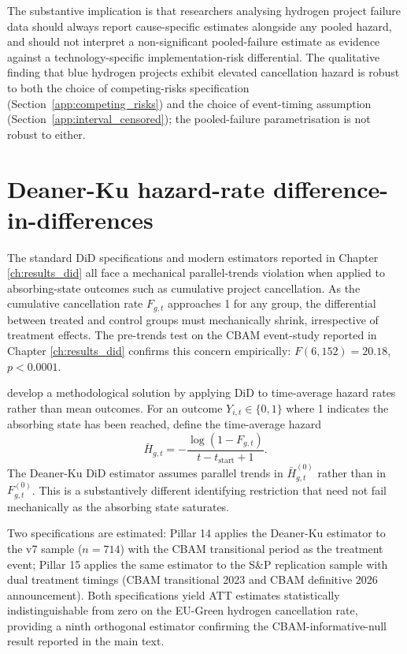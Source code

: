 The substantive implication is that researchers analysing hydrogen project failure data should always report cause-specific estimates alongside any pooled hazard, and should not interpret a non-significant pooled-failure estimate as evidence against a technology-specific implementation-risk differential. The qualitative finding that blue hydrogen projects exhibit elevated cancellation hazard is robust to both the choice of competing-risks specification (Section~\ref{app:competing_risks}) and the choice of event-timing assumption (Section~\ref{app:interval_censored}); the pooled-failure parametrisation is not robust to either.

\section{Deaner-Ku hazard-rate difference-in-differences}
\label{app:deaner_ku}

The standard DiD specifications and modern estimators reported in Chapter \ref{ch:results_did} all face a mechanical parallel-trends violation when applied to absorbing-state outcomes such as cumulative project cancellation. As the cumulative cancellation rate $F_{g,t}$ approaches 1 for any group, the differential between treated and control groups must mechanically shrink, irrespective of treatment effects. The pre-trends test on the CBAM event-study reported in Chapter \ref{ch:results_did} confirms this concern empirically: $F(6, 152) = 20.18$, $p < 0.0001$.

\cite{deaner2024causal} develop a methodological solution by applying DiD to time-average hazard rates rather than mean outcomes. For an outcome $Y_{i,t} \in \{0,1\}$ where 1 indicates the absorbing state has been reached, define the time-average hazard
\[
\bar{H}_{g,t} = -\frac{\log(1 - F_{g,t})}{t - t_{\text{start}} + 1}.
\]
The Deaner-Ku DiD estimator assumes parallel trends in $\bar{H}_{g,t}^{(0)}$ rather than in $F_{g,t}^{(0)}$. This is a substantively different identifying restriction that need not fail mechanically as the absorbing state saturates.

Two specifications are estimated: Pillar 14 applies the Deaner-Ku estimator to the v7 sample ($n = 714$) with the CBAM transitional period as the treatment event; Pillar 15 applies the same estimator to the S\&P replication sample with dual treatment timings (CBAM transitional 2023 and CBAM definitive 2026 announcement). Both specifications yield ATT estimates statistically indistinguishable from zero on the EU-Green hydrogen cancellation rate, providing a ninth orthogonal estimator confirming the CBAM-informative-null result reported in the main text.

